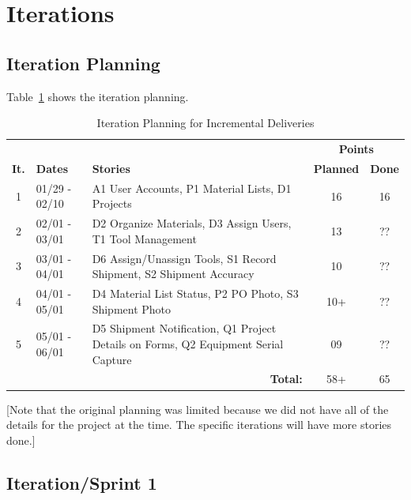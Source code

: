 \documentclass{article}
\begin{document}
\section{Iterations}

\subsection{Iteration Planning}

Table~\ref{tab:it-planning} shows the iteration planning.

\begin{table}[h!]
\centering
\begin{tabular}{c l p{7cm} c c}
\hline
 & & & \multicolumn{2}{c}{\bf Points }  \\
\textbf{It.} & \textbf{Dates} & \textbf{Stories} & \textbf{Planned} & \textbf{Done} \\
\hline
1 & 01/29 - 02/10 & A1 User Accounts, P1 Material Lists, D1 Projects & 16 & 16\\ \hline
2 & 02/01 - 03/01 & D2 Organize Materials, D3 Assign Users, T1 Tool Management & 13 & ?? \\ \hline
3 & 03/01 - 04/01 & D6 Assign/Unassign Tools, S1 Record Shipment, S2 Shipment Accuracy & 10 & ?? \\ \hline
4 & 04/01 - 05/01 & D4 Material List Status, P2 PO Photo, S3 Shipment Photo & 10+ & ??\\ \hline
5 & 05/01 - 06/01 & D5 Shipment Notification, Q1 Project Details on Forms, Q2 Equipment Serial Capture & 09 & ?? \\ \hline
\multicolumn{3}{r}{\bf Total: } & 58+ & 65 \\ \hline
\end{tabular}
\caption{Iteration Planning for Incremental Deliveries}\label{tab:it-planning}
\end{table}

[Note that the original planning was limited because we did not have all of the details for the project at the time. The specific iterations will have more stories done.]

\subsection{Iteration/Sprint 1}
\end{document}
